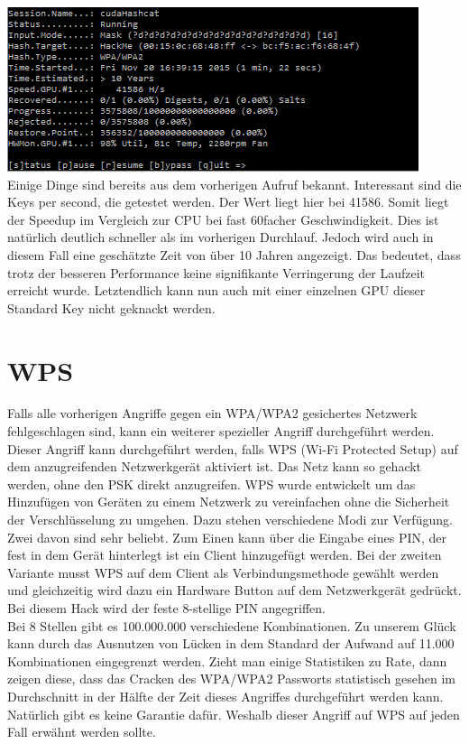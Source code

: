 \includegraphics[width=\textwidth]{bilder/wlan/cudaHashcatNUMSeriesCrack.png}\\

 Einige Dinge sind bereits aus dem vorherigen Aufruf bekannt. Interessant sind die Keys per second, die getestet werden. Der Wert liegt hier bei 41586. Somit liegt der Speedup im Vergleich zur CPU bei fast 60facher
Geschwindigkeit. Dies ist natürlich deutlich schneller als im vorherigen Durchlauf. Jedoch wird auch in diesem Fall eine geschätzte Zeit von über 10 Jahren angezeigt. Das bedeutet, dass trotz der besseren Performance keine signifikante Verringerung der Laufzeit erreicht wurde. 
Letztendlich kann nun auch mit einer einzelnen GPU dieser Standard Key nicht geknackt werden.\\


\section{WPS}

Falls alle vorherigen Angriffe gegen ein WPA/WPA2 gesichertes Netzwerk fehlgeschlagen sind, kann ein weiterer spezieller Angriff durchgeführt werden. Dieser Angriff kann durchgeführt werden, falls WPS (Wi-Fi Protected Setup) auf dem anzugreifenden Netzwerkgerät aktiviert ist. Das Netz kann so gehackt werden, ohne den PSK direkt anzugreifen. WPS wurde entwickelt um das Hinzufügen von Geräten zu einem Netzwerk zu vereinfachen ohne die Sicherheit der Verschlüsselung zu umgehen. Dazu stehen verschiedene Modi zur Verfügung. Zwei davon sind sehr beliebt. Zum Einen kann über die Eingabe eines PIN, der fest in dem Gerät hinterlegt ist ein Client hinzugefügt werden. Bei der zweiten Variante musst WPS auf dem Client als Verbindungsmethode gewählt werden und gleichzeitig wird dazu ein Hardware Button auf dem Netzwerkgerät gedrückt. Bei diesem Hack wird der feste 8-stellige PIN angegriffen. \\

Bei 8 Stellen gibt es 100.000.000 verschiedene Kombinationen. Zu unserem Glück kann durch das Ausnutzen von Lücken in dem Standard der Aufwand auf 11.000 Kombinationen eingegrenzt werden. Zieht man einige Statistiken zu Rate, dann zeigen diese, dass das Cracken des WPA/WPA2 Passworts statistisch gesehen im Durchschnitt in der Hälfte der Zeit dieses Angriffes durchgeführt werden kann. Natürlich gibt es keine Garantie dafür. Weshalb dieser Angriff auf WPS auf jeden Fall erwähnt werden sollte. 


